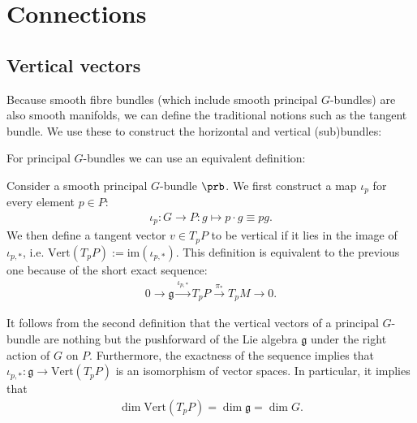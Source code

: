 \section{Connections}
\subsection{Vertical vectors}

    Because smooth fibre bundles (which include smooth principal $G$-bundles) are also smooth manifolds, we can define the traditional notions such as the tangent bundle. We use these to construct the horizontal and vertical (sub)bundles:

    For principal $G$-bundles we can use an equivalent definition:
    \begin{adefinition}
        Consider a smooth principal $G$-bundle $\prb$. We first construct a map $\iota_p$ for every element $p\in P$:
        \begin{gather}
            \iota_p:G\rightarrow P: g\mapsto p\cdot g\equiv pg.
        \end{gather}
        We then define a tangent vector $v\in T_p P$ to be vertical if it lies in the image of $\iota_{p,\ast}$, i.e. $\text{Vert}(T_pP) := \text{im}(\iota_{p,\ast})$. This definition is equivalent to the previous one because of the short exact sequence:
        \begin{gather}
            0\rightarrow\mathfrak{g}\xrightarrow{\iota_{p,\ast}}T_pP\xrightarrow{\pi_\ast}T_pM\rightarrow0.
        \end{gather}
    \end{adefinition}

    \begin{property}[Dimension]
        It follows from the second definition that the vertical vectors of a principal $G$-bundle are nothing but the pushforward of the Lie algebra $\mathfrak{g}$ under the right action of $G$ on $P$. Furthermore, the exactness of the sequence implies that $\iota_{p,\ast}:\mathfrak{g}\rightarrow\text{Vert}(T_pP)$ is an isomorphism of vector spaces. In particular, it implies that
        \begin{gather}
            \label{manifolds:vertical_dimension}
            \dim\text{Vert}(T_pP) = \dim\mathfrak{g} = \dim G.
        \end{gather}
    \end{property}

